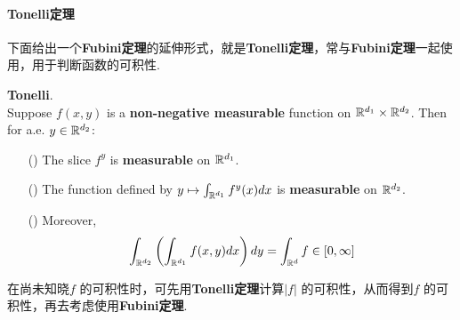 \paragraph{\textbf{Tonelli}定理}
	下面给出一个\textbf{Fubini定理}的延伸形式，就是\textbf{Tonelli定理}，常与\textbf{Fubini定理}一起使用，用于判断函数的可积性.
	\begin{thm}\label{thm 3.5.2}
		\textbf{Tonelli}. \\
		Suppose $f(x , y)$ is a \textbf{non-negative measurable} function on $\mathbb{R}^{d_1} \times \mathbb{R}^{d_2}$. Then for a.e. $y \in \mathbb{R}^{d_2}$:
		\begin{enumerate}
			\item[(\rmnum{1})]The slice $f^y$ is \textbf{measurable} on $\mathbb{R}^{d_1}$.
			
			\item[(\rmnum{2})]The function defined by $y \mapsto \int_{\mathbb{R}^{d_1}}{f^{y}(x) dx}$ is \textbf{measurable} on $\mathbb{R}^{d_2}$.
			
			\item[(\rmnum{3})]Moreover,
			\begin{align}
				\int_{\mathbb{R}^{d_2}}{\left( \int_{\mathbb{R}^{d_1}}{f(x , y) dx} \right) dy}
				= \int_{\mathbb{R}^d}{f} \in [0 , \infty]
			\end{align}
		\end{enumerate}
		
		\vspace{1em}
		
		\begin{rmk}
			在尚未知晓$f$ 的可积性时，可先用\textbf{Tonelli定理}计算$\left| f \right|$ 的可积性，从而得到$f$ 的可积性，再去考虑使用\textbf{Fubini定理}.
		\end{rmk}
	

\end{thm}
